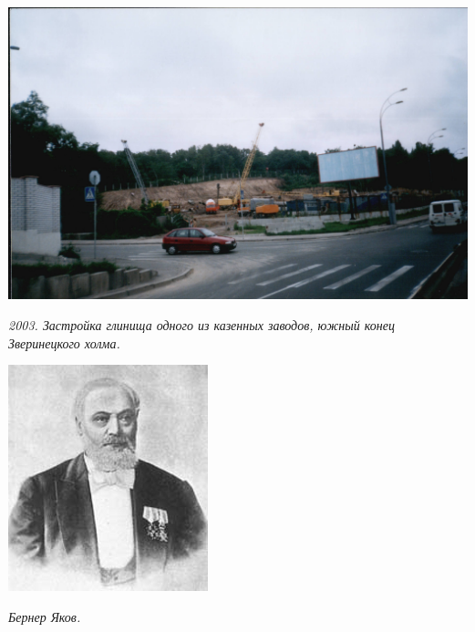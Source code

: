 \begin{center}
\includegraphics[width=0.90\linewidth]{pix/out0011.jpg}

\textit{2003. Застройка глинища одного из казенных заводов, южный конец Зверинецкого холма.}
\end{center} 
\vspace*{\fill}
\newpage
\vspace*{\fill}
\begin{center}
\includegraphics[width=0.60\linewidth]{faces/berner.jpg}

\textit{Бернер Яков.}
\end{center} 

